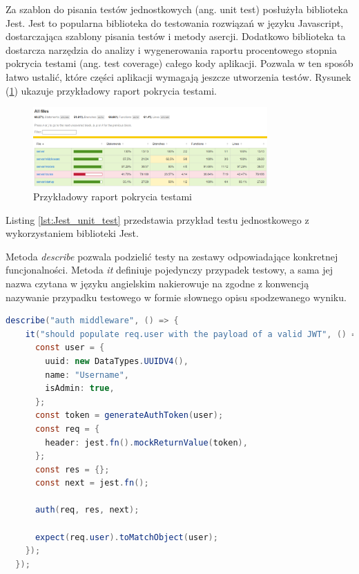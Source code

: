 \documentclass{sprz}
\begin{document}
Za szablon do pisania testów jednostkowych (ang. unit test) posłużyła biblioteka Jest. Jest to popularna biblioteka do testowania rozwiązań w języku Javascript, dostarczająca szablony pisania testów i metody asercji. Dodatkowo biblioteka ta dostarcza narzędzia do analizy i wygenerowania raportu procentowego stopnia pokrycia testami (ang. test coverage) całego kody aplikacji. Pozwala w ten sposób łatwo ustalić, które części aplikacji wymagają jeszcze utworzenia testów. Rysunek (\ref{img:test_coverage}) ukazuje przykładowy raport pokrycia testami.

\begin{figure}[h]
  \centering
  \includegraphics[width=0.8\textwidth]{sprz/test_coverage}
  \caption{Przykładowy raport pokrycia testami}
  \label{img:test_coverage}
\end{figure}

Listing \ref{lst:Jest_unit_test} przedstawia przykład testu jednostkowego z wykorzystaniem biblioteki Jest.

Metoda \textit{describe} pozwala podzielić testy na zestawy odpowiadające konkretnej funcjonalności. Metoda \textit{it} definiuje pojedynczy przypadek testowy, a sama jej nazwa czytana w języku angielskim nakierowuje na zgodne z konwencją nazywanie przypadku testowego w formie słownego opisu spodzewanego wyniku.

\begin{lstlisting}[language=Java,caption={Test jednostkowy z wykorzystaniem Jest}, label={lst:Jest_unit_test}]
  describe("auth middleware", () => {
    it("should populate req.user with the payload of a valid JWT", () => {
      const user = {
        uuid: new DataTypes.UUIDV4(),
        name: "Username",
        isAdmin: true,
      };
      const token = generateAuthToken(user);
      const req = {
        header: jest.fn().mockReturnValue(token),
      };
      const res = {};
      const next = jest.fn();
  
      auth(req, res, next);
  
      expect(req.user).toMatchObject(user);
    });
  });
\end{lstlisting}
\end{document}
